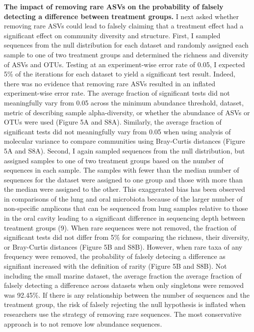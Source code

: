 \documentclass[
]{article}
\begin{document}
\textbf{The impact of removing rare ASVs on the probability of falsely
detecting a difference between treatment groups.} I next asked whether
removing rare ASVs could lead to falsely claiming that a treatment
effect had a significant effect on community diversity and structure.
First, I sampled sequences from the null distribution for each dataset
and randomly assigned each sample to one of two treatment groups and
determined the richness and diversity of ASVs and OTUs. Testing at an
experiment-wise error rate of 0.05, I expected 5\% of the iterations for
each dataset to yield a significant test result. Indeed, there was no
evidence that removing rare ASVs resulted in an inflated experiment-wise
error rate. The average fraction of significant tests did not
meaningfully vary from 0.05 across the minimum abundance threshold,
dataset, metric of describing sample alpha-diversity, or whether the
abundance of ASVs or OTUs were used (Figure 5A and S8A). Similarly, the
average fraction of significant tests did not meaningfully vary from
0.05 when using analysis of molecular variance to compare communities
using Bray-Curtis distances (Figure 5A and S8A). Second, I again sampled
sequences from the null distribution, but assigned samples to one of two
treatment groups based on the number of sequences in each sample. The
samples with fewer than the median number of sequences for the dataset
were assigned to one group and those with more than the median were
assigned to the other. This exaggerated bias has been observed in
comparisons of the lung and oral microbiota because of the larger number
of non-specific amplicons that can be sequenced from lung samples
relative to those in the oral cavity leading to a significant difference
in sequencing depth between treatment groups (9). When rare sequences
were not removed, the fraction of significant tests did not differ from
5\% for comparing the richness, their diversity, or Bray-Curtis
distances (Figure 5B and S8B). However, when rare taxa of any frequency
were removed, the probability of falsely detecing a difference as
signifiant increased with the definition of rarity (Figure 5B and S8B).
Not including the small marine dataset, the average fraction the average
fraction of falsely detecting a difference across datasets when only
singletons were removed was 92.45\%. If there is any relationship
between the number of sequences and the treatment group, the risk of
falsely rejecting the null hypothesis is inflated when researchers use
the strategy of removing rare sequences. The most conservative approach
is to not remove low abundance sequences.
\end{document}
